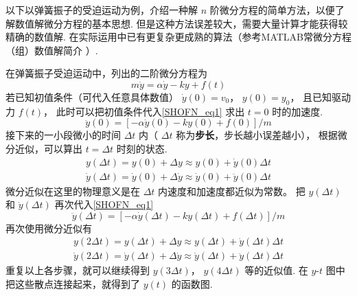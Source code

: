 
以下以弹簧振子的受迫运动为例，介绍一种解 $n$ 阶微分方程的简单方法，以便了解数值解微分方程的基本思想. 但是这种方法误差较大，需要大量计算才能获得较精确的数值解. 在实际运用中已有更复杂更成熟的算法（参考MATLAB常微分方程（组）数值解简介%
）.

在弹簧振子受迫运动中，列出的二阶微分方程为
\begin{equation}\label{SHOFN_eq1}
m\ddot y = \alpha \dot y - ky + f(t)
\end{equation}
若已知初值条件（可代入任意具体数值） $\dot y(0) = v_0$，  $y(0) = y_0$， 且已知驱动力 $f(t)$， 此时可以把初值条件代入\autoref{SHOFN_eq1} 求出 $t = 0$ 时的加速度.
\begin{equation}
\ddot y(0) = [- \alpha \dot y(0) - ky(0) + f(0)]/m
\end{equation}
接下来的一小段微小的时间 $\Delta t$ 内（ $\Delta t$ 称为\textbf{步长}，步长越小误差越小）， 根据微分近似，可以算出 $t = \Delta t$ 时刻的状态.
\begin{gather}
y(\Delta t) =  y(0) + \Delta y \approx y(0) + \dot y(0) \Delta t\\
\dot y(\Delta t) = \dot y(0) + \Delta \dot y \approx \dot y(0) + \ddot y(0) \Delta t
\end{gather}
微分近似在这里的物理意义是在 $\Delta t$ 内速度和加速度都近似为常数。 把 $y(\Delta t)$ 和 $\dot y(\Delta t)$ 再次代入\autoref{SHOFN_eq1}
\begin{equation}
\ddot y(\Delta t) = [- \alpha \dot y(\Delta t) - ky(\Delta t) + f(\Delta t)]/m
\end{equation}
再次使用微分近似有
\begin{gather}
y(2\Delta t) =  y(\Delta t) + \Delta y \approx y(\Delta t) + \dot y(\Delta t) \Delta t\\
\dot y(2\Delta t) = \dot y(\Delta t) + \Delta \dot y \approx \dot y(\Delta t) + \ddot y(\Delta t) \Delta t
\end{gather}
重复以上各步骤，就可以继续得到 $y(3\Delta t)$，  $y(4\Delta t)$ 等的近似值. 在 $y$-$t$ 图中把这些散点连接起来，就得到了 $y(t)$ 的函数图.

